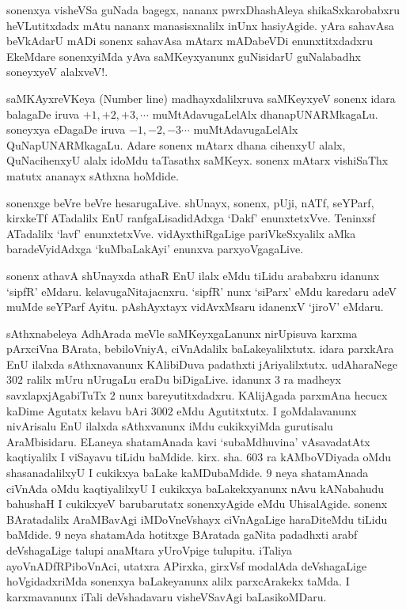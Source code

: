 sonenxya visheVSa guNada bagegx, nananx pwrxDhashAleya shikaSxkarobabxru heVLutitxdadx mAtu nananx manasisxnalilx inUnx hasiyAgide. yAra sahavAsa beVkAdarU mADi sonenx sahavAsa mAtarx mADabeVDi enunxtitxdadxru EkeMdare sonenxyiMda yAva saMKeyxyanunx guNisidarU guNalabadhx soneyxyeV alalxveV!.

saMKAyxreVKeya {\rm (Number line)} madhayxdalilxruva saMKeyxyeV sonenx idara balagaDe iruva $+1,+2,+3,\cdots$ muMtAdavugaLelAlx dhanapUNARMkagaLu. soneyxya eDagaDe iruva $-1,-2,-3\cdots$ muMtAdavugaLelAlx QuNapUNARMkagaLu. Adare sonenx mAtarx dhana cihenxyU alalx, QuNacihenxyU alalx idoMdu taTasathx saMKeyx. sonenx mAtarx vishiSaThx matutx ananayx sAthxna hoMdide.

sonenxge beVre beVre hesarugaLive. shUnayx, sonenx, pUji, nATf, seYParf, kirxkeTf ATadalilx EnU ranfgaLisadidAdxga `Dakf' enunxtetxVve. Teninxsf ATadalilx `lavf' enunxtetxVve. vidAyxthiRgaLige pariVkeSxyalilx aMka baradeVyidAdxga `kuMbaLakAyi' enunxva parxyoVgagaLive.

sonenx athavA shUnayxda athaR EnU ilalx eMdu tiLidu arababxru idanunx `sipfR' eMdaru. kelavugaNitajacnxru. `sipfR' nunx `siParx' eMdu karedaru adeV muMde seYParf Ayitu. pAshAyxtayx vidAvxMsaru idanenxV `jiroV' eMdaru.

sAthxnabeleya AdhArada meVle saMKeyxgaLanunx nirUpisuva karxma pArxciVna BArata, bebiloVniyA, ciVnAdalilx baLakeyalilxtutx. idara parxkAra EnU ilalxda sAthxnavanunx KAlibiDuva padathxti jAriyalilxtutx. udAharaNege $302$ ralilx mUru nUrugaLu eraDu biDigaLive. idanunx $3$ ra madheyx savxlapxjAgabiTuTx $2$ nunx bareyutitxdadxru. KAlijAgada parxmAna hecucx kaDime Agutatx kelavu bAri $3002$ eMdu Agutitxtutx. I goMdalavanunx nivArisalu EnU ilalxda sAthxvanunx iMdu cukikxyiMda gurutisalu AraMbisidaru. ELaneya shatamAnada kavi `subaMdhuvina' vAsavadatAtx kaqtiyalilx I viSayavu tiLidu baMdide. kirx. sha. $603$ ra kAMboVDiyada oMdu shasanadalilxyU I cukikxya baLake kaMDubaMdide. $9$ neya shatamAnada ciVnAda oMdu kaqtiyalilxyU I cukikxya baLakekxyanunx nAvu kANabahudu bahushaH I cukikxyeV barubarutatx sonenxyAgide eMdu UhisalAgide. sonenx BAratadalilx AraMBavAgi iMDoVneVshayx ciVnAgaLige haraDiteMdu tiLidu baMdide. $9$ neya shatamAda hotitxge BAratada gaNita \-padadhxti arabf deVshagaLige talupi anaMtara yUroVpige tulupitu. iTaliya ayoVnADfRPiboVnAci, utatxra APirxka, girxVsf modalAda deVshagaLige hoVgidadxriMda sonenxya baLakeyanunx alilx parxcArakekx taMda. I karxmavanunx iTali deVshadavaru visheVSavAgi \-baLasikoMDaru.  
